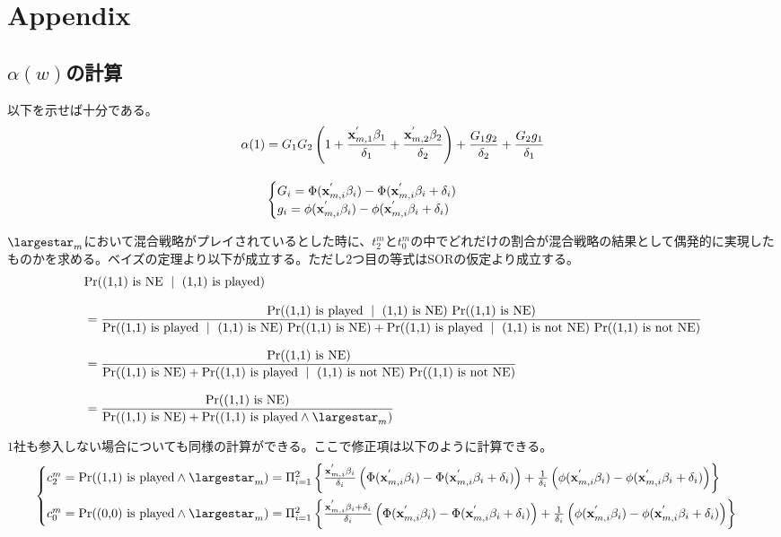 \documentclass{jsarticle}
\begin{document}
\section{Appendix}
\subsection{$\alpha(w)$の計算}
以下を示せば十分である。
\begin{align*}
	\alpha(1)& = G_1 G_2 \left( 1 + \frac{{\bf x}_{m, 1}^{'} \beta_1}{\delta_1} + \frac{{\bf x}_{m, 2}^{'} \beta_2}{\delta_2} \right) + \frac{G_1g_2}{\delta_2} + \frac{G_2g_1}{\delta_1}\\[10pt]
	&\begin{cases}
	G_i =  \Phi({\bf x}_{m, i}^{'} \beta_i) - \Phi({\bf x}_{m, i}^{'} \beta_i  + \delta_i)\\
	g_i = \phi({\bf x}_{m, i}^{'} \beta_i) - \phi({\bf x}_{m, i}^{'} \beta_i  + \delta_i)
	\end{cases}
\end{align*}

$\largestar_m$において混合戦略がプレイされているとした時に、$t_2^m$と$t_0^m$の中でどれだけの割合が混合戦略の結果として偶発的に実現したものかを求める。ベイズの定理より以下が成立する。ただし$2$つ目の等式はSORの仮定より成立する。
\begin{align*}
	&{\rm Pr}(\text{(1,1) is NE}\ \mid\ \text{(1,1) is played}) \\[8pt]
	&= \frac{{\rm Pr}(\text{(1,1) is played}\ \mid\ \text{(1,1) is NE})\ {\rm Pr}(\text{(1,1) is NE})}{{\rm Pr}(\text{(1,1) is played}\ \mid\ \text{(1,1) is NE})\ {\rm Pr}(\text{(1,1) is NE}) + {\rm Pr}(\text{(1,1) is played}\ \mid\ \text{(1,1) is not NE})\ {\rm Pr}(\text{(1,1) is not NE})}\\[8pt]
	&= \frac{{\rm Pr}(\text{(1,1) is NE})}{{\rm Pr}(\text{(1,1) is NE}) + {\rm Pr}(\text{(1,1) is played}\ \mid\ \text{(1,1) is not NE})\ {\rm Pr}(\text{(1,1) is not NE})}\\[8pt]
	&= \frac{{\rm Pr}(\text{(1,1) is NE})}{{\rm Pr}(\text{(1,1) is NE}) + {\rm Pr}(\text{(1,1) is played} \wedge \largestar_m)}
\end{align*}

$1$社も参入しない場合についても同様の計算ができる。ここで修正項は以下のように計算できる。
\begin{align*}
\begin{cases}
	c_2^m = {\rm Pr}(\text{(1,1) is played} \wedge \largestar_m) = \Pi_{i = 1}^2 \left\{ \frac{{\bf x}_{m, i}^{'} \beta_i }{\delta_i} \left( \Phi({\bf x}_{m, i}^{'} \beta_i) - \Phi({\bf x}_{m, i}^{'} \beta_i  + \delta_i) \right) + \frac{1}{\delta_i} \left( \phi({\bf x}_{m, i}^{'} \beta_i ) - \phi({\bf x}_{m, i}^{'} \beta_i  + \delta_i) \right) \right\}\\[10pt]
	c_0^m = {\rm Pr}(\text{(0,0) is played} \wedge \largestar_m) = \Pi_{i = 1}^2 \left\{ \frac{{\bf x}_{m, i}^{'} \beta_i +\delta_i}{\delta_i} \left( \Phi({\bf x}_{m, i}^{'} \beta_i) - \Phi({\bf x}_{m, i}^{'} \beta_i  + \delta_i) \right) + \frac{1}{\delta_i} \left( \phi({\bf x}_{m, i}^{'} \beta_i ) - \phi({\bf x}_{m, i}^{'} \beta_i  + \delta_i) \right) \right\}
\end{cases}
\end{align*}
\end{document}
